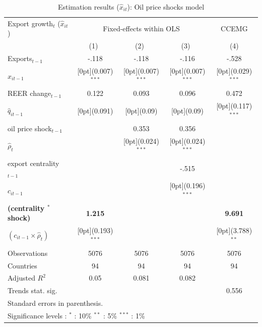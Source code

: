 \documentclass[10pt,letterpaper,pdftex]{article}
\begin{document}
\begin{table}[!htb]\centering
\caption{Estimation results ($\hat{x}_{it}$): Oil price shocks model
\label{tab:OilShocksModel}}
\begin{tabular*}{0.8\textwidth}{@{\extracolsep{\fill}}lcccc}				
Export growth$_t$ ($\hat{x}_{it}$)	& \multicolumn{3}{c}{Fixed-effects within OLS} &	\multicolumn{1}{c}{CCEMG} \\
\cline{2-5}				
	& \multicolumn{1}{c}{(1)\mbox{\ }} &	\multicolumn{1}{c}{(2)\mbox{\ }} &	\multicolumn{1}{c}{(3)\mbox{\ }} &	\multicolumn{1}{c}{(4)} \\
\hline				
Exports$_{t-1}$ &	-.118 &	-.118 &	-.116 &	-.528 \\
\quad $x_{it-1}$ &	\raisebox{.7ex}[0pt]{\scriptsize (0.007)$^{***}$} &	\raisebox{.7ex}[0pt]{\scriptsize (0.007)$^{***}$} &	\raisebox{.7ex}[0pt]{\scriptsize (0.007)$^{***}$} &	\raisebox{.7ex}[0pt]{\scriptsize (0.029)$^{***}$} \\
REER change$_{t-1}$ &	0.122 &	0.093 &	0.096 &	0.472 \\
\quad $\hat{q}_{it-1}$ &	\raisebox{.7ex}[0pt]{\scriptsize (0.091)} &	\raisebox{.7ex}[0pt]{\scriptsize (0.09)} &	\raisebox{.7ex}[0pt]{\scriptsize (0.09)} &	\raisebox{.7ex}[0pt]{\scriptsize (0.117)$^{***}$} \\
oil price shock$_{t-1}$ &	&	0.353 &	0.356 &	\\
\quad $\hat{\rho}_{t}$ &	&	\raisebox{.7ex}[0pt]{\scriptsize (0.024)$^{***}$} &	\raisebox{.7ex}[0pt]{\scriptsize (0.024)$^{***}$} &	\\
export centrality$_{t-1}$ &	&	&	-.515 &	\\
\quad $c_{it-1}$&	&	&	\raisebox{.7ex}[0pt]{\scriptsize (0.196)$^{***}$} &	\\
\textbf{(centrality $^*$ shock)} &	\textbf{1.215} &	&	&	\textbf{9.691} \\
\quad $(c_{it-1} \times \hat{\rho}_{t})$&	\raisebox{.7ex}[0pt]{\scriptsize (0.193)$^{***}$} &	&	&	\raisebox{.7ex}[0pt]{\scriptsize (3.788)$^{**}$} \\
\hline
Observations &	5076 &	5076 &	5076 &	5076 \\
Countries &	94 &	94 &	94 &	94 \\
Adjusted $R^2$ &	0.05 &	0.081 &	0.082 &	\\
Trends stat. sig. &	&	&	&	0.556 \\
\hline\hline	
\multicolumn{5}{l}{\footnotesize{Standard errors in parenthesis.}}\\
\multicolumn{5}{l}{\footnotesize{Significance levels
:\hspace{1em} $^{*}$ : 10\% \hspace{1em}
$^{**}$ : 5\% \hspace{1em} $^{***}$ : 1\% \normalsize}}					
\end{tabular*}%
\end{table}
\end{document}
